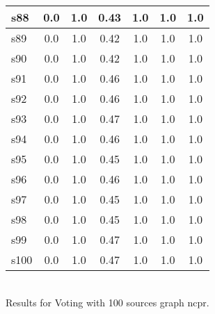\documentclass{article}
\begin{document}
\begin{tabular}{|l|c|c|c|c|c|c|}
\hline
s88 &0.0 & 1.0 & 0.43 & 1.0 & 1.0 & 1.0\\
\hline
s89 &0.0 & 1.0 & 0.42 & 1.0 & 1.0 & 1.0\\
\hline
s90 &0.0 & 1.0 & 0.42 & 1.0 & 1.0 & 1.0\\
\hline
s91 &0.0 & 1.0 & 0.46 & 1.0 & 1.0 & 1.0\\
\hline
s92 &0.0 & 1.0 & 0.46 & 1.0 & 1.0 & 1.0\\
\hline
s93 &0.0 & 1.0 & 0.47 & 1.0 & 1.0 & 1.0\\
\hline
s94 &0.0 & 1.0 & 0.46 & 1.0 & 1.0 & 1.0\\
\hline
s95 &0.0 & 1.0 & 0.45 & 1.0 & 1.0 & 1.0\\
\hline
s96 &0.0 & 1.0 & 0.46 & 1.0 & 1.0 & 1.0\\
\hline
s97 &0.0 & 1.0 & 0.45 & 1.0 & 1.0 & 1.0\\
\hline
s98 &0.0 & 1.0 & 0.45 & 1.0 & 1.0 & 1.0\\
\hline
s99 &0.0 & 1.0 & 0.47 & 1.0 & 1.0 & 1.0\\
\hline
s100 &0.0 & 1.0 & 0.47 & 1.0 & 1.0 & 1.0\\
\hline
\end{tabular}\\

\noindent Results for Voting with 100 sources graph ncpr.
\end{document}
